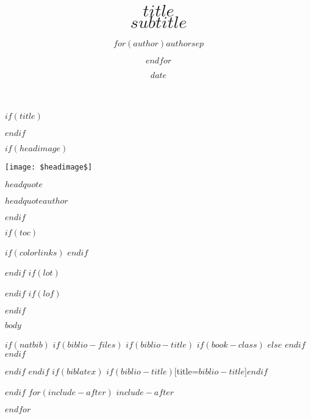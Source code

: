 \documentclass[$if(fontsize)$$fontsize$,$endif$$if(lang)$$babel-lang$,$endif$$if(papersize)$$papersize$paper,$endif$$for(classoption)$$classoption$$sep$,$endfor$]{tufte-handout}
\title{$title$ \\ \small $subtitle$}
\author{$for(author)$$author$$sep$ \and $endfor$}
\date{$date$}
\begin{document}
$if(title)$
\maketitle
$endif$

$if(headimage)$
\begin{marginfigure}
\texttt{[image: \$headimage\$]}
	\epigraph{$headquote$}{\textit{$headquoteauthor$}}
\end{marginfigure}
$endif$




$if(toc)$
{
$if(colorlinks)$
\hypersetup{linkcolor=$if(toccolor)$$toccolor$$else$black$endif$}
$endif$
\setcounter{tocdepth}{$toc-depth$}
\tableofcontents
}
$endif$
$if(lot)$
\listoftables
$endif$
$if(lof)$
\listoffigures
$endif$

$body$



$if(natbib)$
$if(biblio-files)$
$if(biblio-title)$
$if(book-class)$
\renewcommand\bibname{$biblio-title$}
$else$
\renewcommand\refname{$biblio-title$}
$endif$
$endif$



$endif$
$endif$
$if(biblatex)$
\printbibliography$if(biblio-title)$[title=$biblio-title$]$endif$

$endif$
$for(include-after)$
$include-after$

$endfor$
\end{document}

